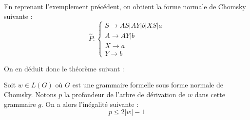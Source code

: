 \begin{example}
    En reprenant l'exemplement précédent, on obtient la forme normale de Chomsky suivante : 
    \[ \overset{\sim}{P} : 
        \begin{cases}
            S \longrightarrow AS | AY | b | XS | a \\ 
            A \longrightarrow AY | b \\ 
            X \longrightarrow a \\ 
            Y \longrightarrow b 
        \end{cases} \] 
\end{example}

On en déduit donc le théorème suivant :

\begin{theorem}
    Soit $w \in L(G)$ où $G$ est une grammaire formelle sous forme normale de Chomsky. 
    Notons $p$ la profondeur de l'arbre de dérivation de $w$ dans cette grammaire $g$. 
    On a alors l'inégalité suivante : 
        \[ \boxed{p \leqslant 2 |w| -1 } \] 
\end{theorem}
